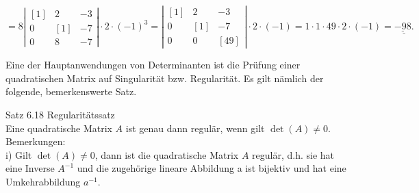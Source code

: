 \documentclass[10pt]{article}
\begin{document}
$$
=8\left|\begin{array}{rrr}
{[1]} & 2 & -3 \\
0 & {[1]} & -7 \\
0 & 8 & -7
\end{array}\right| \cdot 2 \cdot(-1)^{3}=\left|\begin{array}{rrr}
{[1]} & 2 & -3 \\
0 & {[1]} & -7 \\
0 & 0 & {[49]}
\end{array}\right| \cdot 2 \cdot(-1)=1 \cdot 1 \cdot 49 \cdot 2 \cdot(-1)=\underline{\underline{-98} .}
$$

Eine der Hauptanwendungen von Determinanten ist die Prüfung einer quadratischen Matrix auf Singularität bzw. Regularität. Es gilt nämlich der folgende, bemerkenswerte Satz.

Satz 6.18 Regularitätssatz\\
Eine quadratische Matrix $A$ ist genau dann regulär, wenn gilt $\operatorname{det}(A) \neq 0$.\\
Bemerkungen:\\
i) Gilt $\operatorname{det}(A) \neq 0$, dann ist die quadratische Matrix $A$ regulär, d.h. sie hat eine Inverse $A^{-1}$ und die zugehörige lineare Abbildung a ist bijektiv und hat eine Umkehrabbildung $a^{-1}$.
\end{document}
